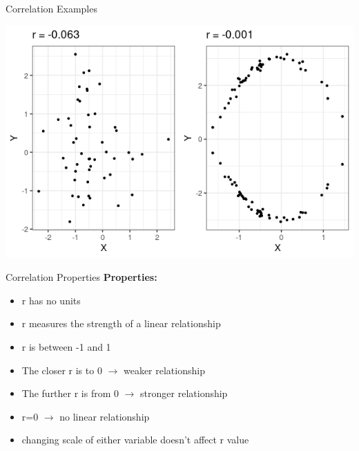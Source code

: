 \documentclass{beamer}
\begin{document}
\begin{frame}{Correlation Examples}
\begin{center}
\includegraphics[scale=0.5]{no_corr_example.png}
\end{center}
\end{frame}

\begin{frame}{Correlation Properties}
\textbf{Properties:}
\begin{itemize}
    \item r has no units
    \item r measures the strength of a linear relationship
    \item r is between -1 and 1
    \item The closer r is to 0 $\rightarrow$ weaker relationship
    \item The further r is from 0 $\rightarrow$ stronger relationship
    \item r=0 $\rightarrow$ no linear relationship
    \item changing scale of either variable doesn't affect r value
\end{itemize}
\end{frame}
\end{document}

